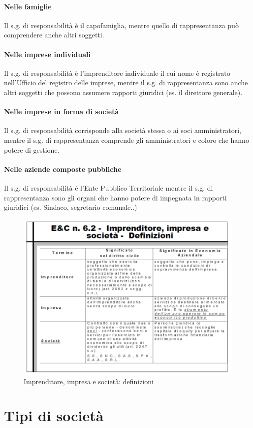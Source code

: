 \documentclass{report}
\begin{document}
	\paragraph{Nelle famiglie}
	Il s.g. di responsabilità è il capofamiglia, mentre quello di rappresentanza può comprendere anche altri soggetti.
	\paragraph{Nelle imprese individuali}
	Il s.g. di responsabilità è l'imprenditore individuale il cui nome è registrato nell'Ufficio del registro delle imprese, mentre il s.g. di rappresentanza sono anche altri soggetti che possono assumere rapporti giuridici (es. il direttore generale).
	\paragraph{Nelle imprese in forma di società}
	Il s.g. di responsabilità corrisponde alla società stessa o ai soci amministratori, mentre il s.g. di rappresentanza comprende gli amministratori e coloro che hanno potere di gestione.
	\paragraph{Nelle aziende composte pubbliche}
	Il s.g. di responsabilità è l'Ente Pubblico Territoriale mentre il s.g. di rappresentanza sono gli organi che hanno potere di impegnata in rapporti giuridici (es. Sindaco, segretario comunale..)
	\begin{figure}[h]
		\centering
		\includegraphics[width=0.7\linewidth]{images/imprenditore-impresa-societa}
		\caption{Imprenditore, impresa e società: definizioni}
		\label{fig:imprenditore-impresa-societa}
	\end{figure}
	\section{Tipi di società}
\end{document}
